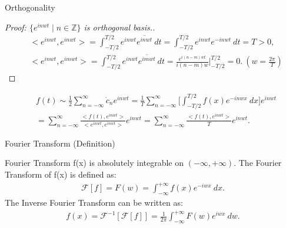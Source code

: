 \documentclass{beamer}
\begin{document}
	\begin{frame}{Orthogonality}
		\begin{proof}[Proof: $\{e^{inwt} \mid n\in\mathbb{Z}\}$ is orthogonal basis.]
			\begin{align*}
				& <e^{inwt}, e^{inwt}> = \int_{-T/2}^{T/2}e^{inwt}\overline{e^{inwt}}\ dt = \int_{-T/2}^{T/2} e^{inwt}e^{-inwt}\ dt = T > 0, \\
				& <e^{inwt}, e^{imwt}> = \int_{-T/2}^{T/2}e^{inwt}\overline{e^{imwt}}\ dt = \frac{e^{i(n-m)wt}}{i(n-m)w} \biggr\rvert_{-T/2}^{T/2} = 0.\ (w = \frac{2\pi}{T})
			\end{align*}
		\end{proof}
		\begin{align*}
			& f(t) \sim \frac{1}{2}\sum_{n=-\infty}^{\infty}\dot{c}_ne^{inwt} = \frac{1}{T}\sum_{n=-\infty}^{\infty}\big[\int_{-T/2}^{T/2}f(x)e^{-inwx}\ dx\big]e^{inwt} \\
			& = \sum_{n=-\infty}^{\infty}\frac{<f(t), e^{inwt}>}{<e^{inwt}, e^{inwt}>}e^{inwt} = \sum_{n=-\infty}^{\infty}\frac{<f(t), e^{inwt}>}{T}e^{inwt}.
		\end{align*}
	\end{frame}
	
	\begin{frame}{Fourier Transform (Definition)}
		\begin{block}{Fourier Transform}
			f(x) is absolutely integrable on $(-\infty, +\infty)$. The Fourier Transform of f(x) is defined as:
			\begin{align*}
				\mathcal{F}[f] = F(w) = \int_{-\infty}^{+\infty}f(x)e^{-iwx}\ dx.
			\end{align*}
			The Inverse Fourier Transform can be written as:
			\begin{align*}
				f(x) = \mathcal{F}^{-1}[\mathcal{F}[f]] = \frac{1}{2\pi}\int_{-\infty}^{+\infty}F(w)e^{iwx}\ dw.
			\end{align*}
		\end{block}
	\end{frame}
	
\end{document}
